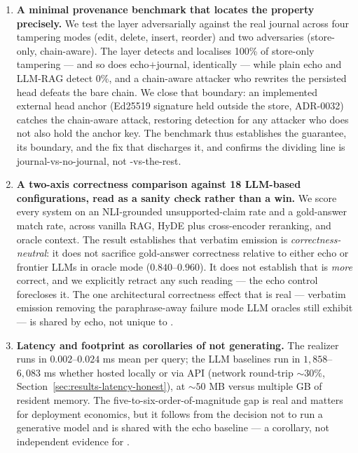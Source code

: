 \begin{enumerate}
    \item \textbf{A minimal provenance benchmark that locates the
    property precisely.} We test the layer adversarially against
    the real journal across four tampering modes (edit, delete,
    insert, reorder) and two adversaries (store-only, chain-aware).
    The layer detects and localises 100\% of store-only tampering
    --- and so does echo$+$journal, identically --- while plain
    echo and LLM-RAG detect 0\%, and a chain-aware attacker who
    rewrites the persisted head defeats the bare chain. We close
    that boundary: an implemented external head anchor (Ed25519
    signature held outside the store, ADR-0032) catches the
    chain-aware attack, restoring detection for any attacker who
    does not also hold the anchor key. The benchmark thus
    establishes the guarantee, its boundary, and the fix that
    discharges it, and confirms the dividing line is
    journal-vs-no-journal, not \hyphae{}-vs-the-rest.

    \item \textbf{A two-axis correctness comparison against 18
    LLM-based configurations, read as a sanity check rather than a
    win.} We score every system on an NLI-grounded unsupported-claim
    rate and a gold-answer match rate, across vanilla RAG, HyDE
    plus cross-encoder reranking, and oracle context. The result
    establishes that verbatim emission is \emph{correctness-neutral}:
    it does not sacrifice gold-answer correctness relative to either
    echo or frontier LLMs in oracle mode ($0.840$--$0.960$). It does
    not establish that \hyphae{} is \emph{more} correct, and we
    explicitly retract any such reading --- the echo control
    forecloses it. The one architectural correctness effect that is
    real --- verbatim emission removing the paraphrase-away failure
    mode LLM oracles still exhibit --- is shared by echo, not unique
    to \hyphae{}.

    \item \textbf{Latency and footprint as corollaries of not
    generating.} The realizer runs in $0.002$--$0.024$ ms mean per
    query; the LLM baselines run in $1{,}858$--$6{,}083$ ms whether
    hosted locally or via API (network round-trip $\sim 30\%$,
    Section~\ref{sec:results-latency-honest}), at $\sim 50$ MB
    versus multiple GB of resident memory. The
    five-to-six-order-of-magnitude gap is real and matters for
    deployment economics, but it follows from the decision not to
    run a generative model and is shared with the echo baseline ---
    a corollary, not independent evidence for \hyphae{}.


\end{enumerate}

